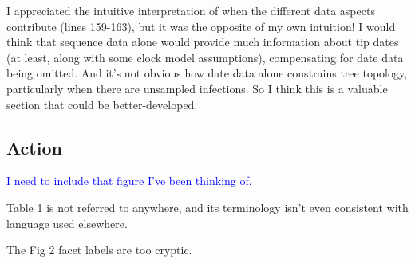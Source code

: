 \documentclass{article}
\begin{document}
I appreciated the intuitive interpretation of when the different data aspects contribute (lines 159-163), but it was the opposite of my own intuition!  I would think that sequence data alone would provide much information about tip dates (at least, along with some clock model assumptions), compensating for date data being omitted.  And it's not obvious how date data alone constrains tree topology, particularly when there are unsampled infections.  So I think this is a valuable section that could be better-developed.

\subsection*{Action}
\textcolor{blue}{I need to include that figure I've been thinking of.}

\begin{footnotesize}
Table 1 is not referred to anywhere, and its terminology isn't even consistent with language used elsewhere.

The Fig 2 facet labels are too cryptic.
\end{footnotesize}
\end{document}

